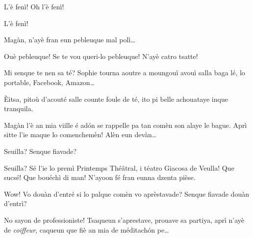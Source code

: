 \begin{drama}

\Mammaspeaks{} L'è fenì!  Oh l'è fenì!


\Spectateurspeaks{} L'è fenì! 





\Nevaousaspeaks Magàn, n'ayè fran eun pebleuque mal polì\ldots

\Maganspeaks Ouè pebleuque! Se te vou queri-lo pebleuque! N'ayè catro tsatte!

\Paganspeaks Mi senque te nen sa té? Sophie tourna aoutre a moungouì avouì salla baga lé, lo portable, Facebook, Amazon\ldots


\Maganspeaks \`Eitsa, pitoù d'acouté salle counte foule de té, ito pi belle achouataye inque tranquila.

\Paganspeaks{} Magàn l'è an mia viille é ad\'on se rappelle pa tan comèn son alaye le bague. Aprì sitte l'ie maque lo comenchemèn! Alèn eun devàn\ldots


\Nevaouspeaks{}  Seuilla? Senque fiavade?

\Paganspeaks Seuilla? Sé l'ie lo premì Printemps Thé\^atral, i téatro Giacosa de Veulla! Que sucsé! Que bouéchì di man! N'ayoon fé fran eunna dzenta pièse.

\Nevaousaspeaks Wow! Vo douàn d'entré si lo palque comèn vo aprèstavade? Senque fiavade douàn d'entrì?

\Paganspeaks{} No sayon de professioniste! Tsaqueun s'aprestave, prouave sa partiya, aprì n'ayè de \textit{coiffeur}, caqueun que fiè an mia de méditach\'on pe\ldots


\end{drama}
